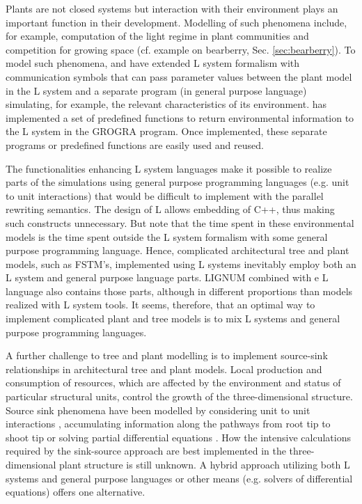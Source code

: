 Plants are  not closed systems but interaction  with their environment
plays an  important function in their development.   Modelling of such
phenomena  include, for example,  computation of  the light  regime in
plant communities  and competition for growing space  (cf.  example on
bearberry,  Sec.   \ref{sec:bearberry}).   To  model  such  phenomena,
\citet{mech:97} and  \citet{mech:96} have extended  L system formalism
with communication symbols that  can pass parameter values between the
plant model in the L system and a separate program (in general purpose
language) simulating, for example, the relevant characteristics of its
environment.   \citet{kurth:94} has  implemented a  set  of predefined
functions to return  environmental information to the L  system in the
GROGRA  program.    Once  implemented,  these   separate  programs  or
predefined functions are easily used and reused.

The functionalities  enhancing L system languages make  it possible to
realize  parts of  the simulations  using general  purpose programming
languages (e.g.  unit to unit interactions) that would be difficult to
implement  with the  parallel rewriting  semantics.  The  design  of L
allows embedding of C++, thus making such constructs unnecessary.  But
note that  the time  spent in these  environmental models is  the time
spent  outside  the  L system  formalism  with  some  general  purpose
programming language.  Hence, complicated architectural tree and plant
models, such as FSTM's,  implemented using L systems inevitably employ
both an L system and  general purpose language parts.  LIGNUM combined
with e  L language  also contains those  parts, although  in different
proportions  than  models realized  with  L system  tools.  It  seems,
therefore, that an optimal way to implement complicated plant and tree
models is to mix L systems and general purpose programming languages.
 
A  further challenge  to  tree  and plant  modelling  is to  implement
source-sink  relationships  in architectural  tree  and plant  models.
Local production  and consumption of resources, which  are affected by
the environment and status of particular structural units, control the
growth of the three-dimensional structure.  Source sink phenomena have
been   modelled    by   considering   unit    to   unit   interactions
\citep{balandier:00}, accumulating information along the pathways from
root  tip   to  shoot  tip  \citep{dereffye:97}   or  solving  partial
differential  equations  \citep{deleuze:97,  palovaara:03}.   How  the
intensive calculations  required by the sink-source  approach are best
implemented in the three-dimensional plant structure is still unknown.
A  hybrid  approach  utilizing  both  L systems  and  general  purpose
languages  or other  means (e.g.   solvers of  differential equations)
offers one alternative.

